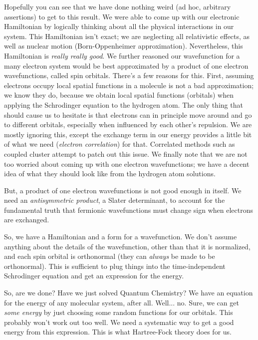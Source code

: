 \documentclass[11pt]{article}
\begin{document}
Hopefully you can see that we have done nothing weird (ad hoc, arbitrary
assertions) to get to this result. We were able to come up with our
electronic Hamiltonian by logically thinking about all the physical
interactions in our system. This Hamiltonian isn't exact; we are
neglecting all relativistic effects, as well as nuclear motion
(Born-Oppenheimer approximation). Nevertheless, this Hamiltonian is
\emph{really really good}. We further reasoned our wavefunction for a
many electron system would be best approximated by a product of one
electron wavefunctions, called spin orbitals. There's a few reasons for
this. First, assuming electrons occupy local spatial functions in a
molecule is not a bad approximation; we know they do, because we obtain local spatial functions (orbitals) 
when applying the Schrodinger equation to the hydrogen atom.
The only thing that should cause us to
hesitate is that electrons can in principle move around and go to
different orbitals, especially when influenced by each other's
repulsion. We are mostly ignoring this, except the exchange term in our
energy provides a little bit of what we need (\emph{electron
correlation}) for that. Correlated methods such as coupled cluster
attempt to patch out this issue. We finally note that we are not too
worried about coming up with one electron wavefunctions; we have a
decent idea of what they should look like from the hydrogen atom
solutions.

But, a product of one electron wavefunctions is not good enough in
itself. We need an \emph{antisymmetric product}, a Slater determinant,
to account for the fundamental truth that fermionic wavefunctions must
change sign when electrons are exchanged.

So, we have a Hamiltonian and a form for a wavefunction. We don't assume
anything about the details of the wavefunction, other than that it is
normalized, and each spin orbital is orthonormal (they can \emph{always}
be made to be orthonormal). This is sufficient to plug things into the
time-independent Schrodinger equation and get an expression for the
energy.

So, are we done? Have we just solved Quantum Chemistry? We have an
equation for the energy of any molecular system, after all. Well... no.
Sure, we can get \emph{some energy} by just choosing some random
functions for our orbitals. This probably won't work out too well. We
need a systematic way to get a good energy from this expression. This is
what Hartree-Fock theory does for us.
\end{document}
